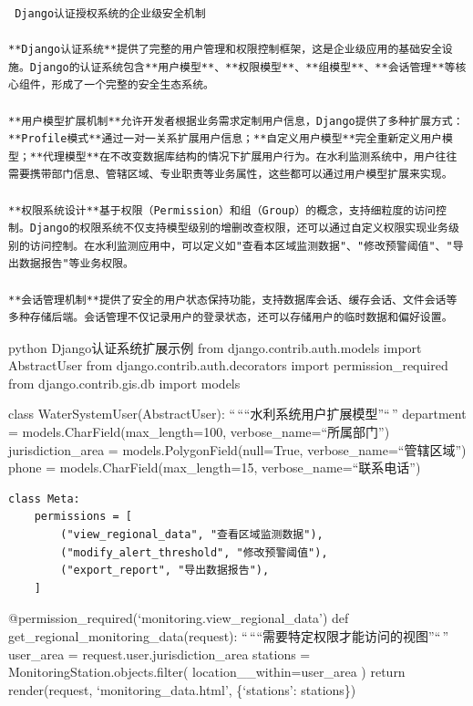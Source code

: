 \begin{lstlisting}
 Django认证授权系统的企业级安全机制

**Django认证系统**提供了完整的用户管理和权限控制框架，这是企业级应用的基础安全设施。Django的认证系统包含**用户模型**、**权限模型**、**组模型**、**会话管理**等核心组件，形成了一个完整的安全生态系统。

**用户模型扩展机制**允许开发者根据业务需求定制用户信息，Django提供了多种扩展方式：**Profile模式**通过一对一关系扩展用户信息；**自定义用户模型**完全重新定义用户模型；**代理模型**在不改变数据库结构的情况下扩展用户行为。在水利监测系统中，用户往往需要携带部门信息、管辖区域、专业职责等业务属性，这些都可以通过用户模型扩展来实现。

**权限系统设计**基于权限（Permission）和组（Group）的概念，支持细粒度的访问控制。Django的权限系统不仅支持模型级别的增删改查权限，还可以通过自定义权限实现业务级别的访问控制。在水利监测应用中，可以定义如"查看本区域监测数据"、"修改预警阈值"、"导出数据报告"等业务权限。

**会话管理机制**提供了安全的用户状态保持功能，支持数据库会话、缓存会话、文件会话等多种存储后端。会话管理不仅记录用户的登录状态，还可以存储用户的临时数据和偏好设置。
\end{lstlisting}

python  Django认证系统扩展示例 from django.contrib.auth.models import AbstractUser from django.contrib.auth.decorators import permission\_required from django.contrib.gis.db import models

class WaterSystemUser(AbstractUser): ``\,````水利系统用户扩展模型''``\,'' department = models.CharField(max\_length=100, verbose\_name=``所属部门'') jurisdiction\_area = models.PolygonField(null=True, verbose\_name=``管辖区域'') phone = models.CharField(max\_length=15, verbose\_name=``联系电话'')

\begin{verbatim}
class Meta:
    permissions = [
        ("view_regional_data", "查看区域监测数据"),
        ("modify_alert_threshold", "修改预警阈值"),
        ("export_report", "导出数据报告"),
    ]
\end{verbatim}

@permission\_required(`monitoring.view\_regional\_data') def get\_regional\_monitoring\_data(request): ``\,````需要特定权限才能访问的视图''``\,'' user\_area = request.user.jurisdiction\_area stations = MonitoringStation.objects.filter( location\_\_within=user\_area ) return render(request, `monitoring\_data.html', \{`stations': stations\})

